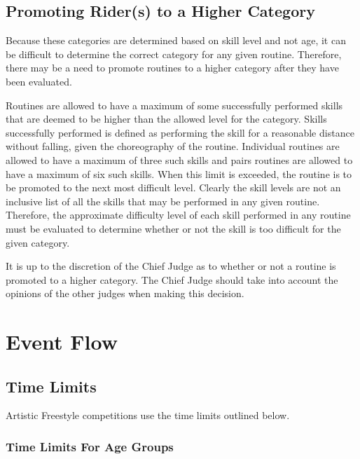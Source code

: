 \subsection{Promoting Rider(s) to a Higher Category}
Because these categories are determined based on skill level and not age, it can be difficult to determine the correct category for any given routine.
Therefore, there may be a need to promote routines to a higher category after they have been evaluated.

Routines are allowed to have a maximum of some successfully performed skills that are deemed to be higher than the allowed level for the category.
Skills successfully performed is defined as performing the skill for a reasonable distance without falling, given the choreography of the routine.
Individual routines are allowed to have a maximum of three such skills and pairs routines are allowed to have a maximum of six such skills.
When this limit is exceeded, the routine is to be promoted to the next most difficult level.
Clearly the skill levels are not an inclusive list of all the skills that may be performed in any given routine.
Therefore, the approximate difficulty level of each skill performed in any routine must be evaluated to determine whether or not the skill is too difficult for the given category.

It is up to the discretion of the Chief Judge as to whether or not a routine is promoted to a higher category.
The Chief Judge should take into account the opinions of the other judges when making this decision.

\section{Event Flow}

\subsection{Time Limits}

Artistic Freestyle competitions use the time limits outlined below.

\subsubsection{Time Limits For Age Groups}

